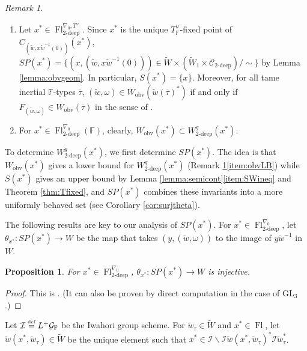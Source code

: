 \documentclass[oneside,a4paper,english, 11pt]{amsart}
\theoremstyle{plain}
\theoremstyle{plain}
\newtheorem{prop}[thm]{Proposition}
\theoremstyle{plain}
\theoremstyle{plain}
\theoremstyle{plain}
\theoremstyle{plain}
\theoremstyle{definition}
\theoremstyle{definition}
\theoremstyle{definition}
\theoremstyle{remark}
\newtheorem{rmk}[thm]{Remark}
\numberwithin{equation}{section}
\newcommand{\F}{\mathbb{F}}
\newcommand{\cC}{\mathcal{C}}
\newcommand{\cG}{\mathcal{G}}
\newcommand{\cI}{\mathcal{I}}
\newcommand{\GL}{\mathrm{GL}}
\newcommand{\tld}[1]{\widetilde{#1}}
\newcommand{\taubar}{\overline{\tau}}
\newcommand{\defeq}{\stackrel{\textrm{\tiny{def}}}{=}}
\newcommand{\obv}{\mathrm{obv}}
\DeclareMathOperator{\Fl}{Fl}
\newcommand{\ra}{\rightarrow}
\begin{document}
\begin{rmk}\label{rmk:obv}
\begin{enumerate}
\item 
Let $x^* \in \Fl_{2\textrm{-deep}}^{\nabla_0,T^\vee}$. Since $x^* $ is the unique $T^{\vee}_\F$-fixed point of $C_{(\tld{w},x\tld{w}^{-1}(0))}(x^*)$,  $SP(x^*) = \{(x,(\tld{w},x\tld{w}^{-1}(0))) \in \tld{W} \times (\tld{W}_1 \times \cC_{2\text{-deep}})/\sim\}$ by  Lemma \ref{lemma:obvgeom}. In particular, $S(x^*) = \{x\}$. Moreover, for all tame inertial $\F$-types $\taubar$, $(\tld{w},\omega) \in W_{\obv}(\tld{w}(\taubar)^*)$ if and only if $F_{(\tld{w},\omega)} \in W_{\obv}(\taubar)$ in the sense of \cite[Definition 2.6.3]{MLM}. 
%
%
\item \label{item:obvLB} For $x^* \in \Fl_{2\textrm{-deep}}^{\nabla_0}(\F)$, clearly, $W_{\obv}(x^*) \subset W^g_{2\textrm{-deep}}(x^*)$.
\end{enumerate}
\end{rmk}

To determine $W^g_{2\textrm{-deep}}(x^*)$, we first determine $SP(x^*)$. 
The idea is that $W_{\obv}(x^*)$ gives a lower bound for $W^g_{2\textrm{-deep}}(x^*)$ (Remark \ref{rmk:obv}\eqref{item:obvLB}) while $S(x^*)$ gives an upper bound by Lemma \ref{lemma:semicont}\eqref{item:SWineq} and Theorem \ref{thm:Tfixed}, and $SP(x^*)$ combines these invariants into a more uniformly behaved set (see Corollary \ref{cor:surjtheta}). 

The following results are key to our analysis of $SP(x^*)$. 
For $x^* \in \Fl_{2\textrm{-deep}}^{\nabla_0}$, let $\theta_{x^*}: SP(x^*) \ra W$ be the map that takes $(y,(\tld{w},\omega))$ to the image of $y \tld{w}^{-1}$ in $W$.

\begin{prop}\label{prop:injtheta}
For $x^* \in \Fl_{2\textrm{-deep}}^{\nabla_0}$, $\theta_{x^*}: SP(x^*) \ra W$ is injective.
\end{prop}
\begin{proof}
This is \cite[Prop.~3.6.4]{OBW}.
(It can also be proven by direct computation in the case of $\GL_3$.)
%
\end{proof}

Let $\cI\defeq L^+\cG_{\F}$ be the Iwahori group scheme.
For $\tld{w}_\tau \in \tld{W}$ and $x^* \in \Fl$, let $\tld{w}(x^*,\tld{w}_\tau) \in \tld{W}$ be the unique element such that $x^* \in \cI\backslash \cI \tld{w}(x^*,\tld{w}_\tau)^* \cI \tld{w}_\tau^*$.
\end{document}
